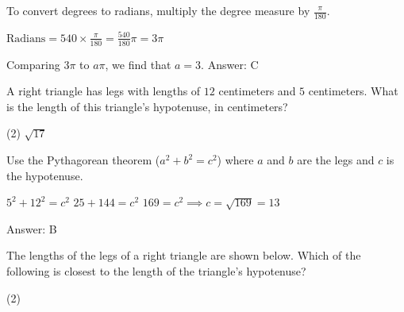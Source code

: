 \documentclass[11pt,paper=a4,answers]{exam}
\begin{document}
\begin{questions}
\begin{solution}
To convert degrees to radians, multiply the degree measure by $\frac{\pi}{180}$.
\vspace{5pt}
\begin{center}
$\text{Radians} = 540 \times \frac{\pi}{180} = \frac{540}{180}\pi = 3\pi$
\end{center}
\vspace{5pt}
Comparing $3\pi$ to $a\pi$, we find that $a = 3$.
\vspace{5pt}
Answer: \colorbox{yellow!100}{C}
\end{solution}

\vspace{1cm}

\question
A right triangle has legs with lengths of $12$ centimeters and $5$ centimeters. What is the length of this triangle's hypotenuse, in centimeters?
\begin{center}
\end{center}
\begin{tasks}(2)
    \task $\sqrt{17}$
\end{tasks}

\begin{solution}
Use the Pythagorean theorem ($a^2 + b^2 = c^2$) where $a$ and $b$ are the legs and $c$ is the hypotenuse.
\vspace{5pt}
\begin{center}
$5^2 + 12^2 = c^2$
\vspace{5pt}
$25 + 144 = c^2$
\vspace{5pt}
$169 = c^2 \implies c = \sqrt{169} = 13$
\end{center}
\vspace{5pt}
Answer: \colorbox{yellow!100}{B}
\end{solution}

\vspace{1cm}

\question
The lengths of the legs of a right triangle are shown below. Which of the following is closest to the length of the triangle's hypotenuse?
\begin{center}
\end{center}
\begin{tasks}(2)
\end{tasks}


\end{questions}
\end{document}
